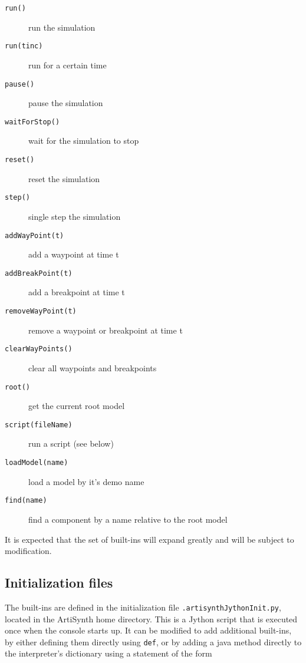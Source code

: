 \documentclass{article}
\begin{document}
\begin{description}

\item[{\tt run()}] \mbox{}
 run the simulation

\item[{\tt run(tinc)}] \mbox{}
 run for a certain time

\item[{\tt pause()}] \mbox{}
 pause the simulation

\item[{\tt waitForStop()}] \mbox{}
 wait for the simulation to stop

\item[{\tt reset()}] \mbox{}
 reset the simulation

\item[{\tt step()}] \mbox{}
 single step the simulation

\item[{\tt addWayPoint(t)}] \mbox{}
 add a waypoint at time t

\item[{\tt addBreakPoint(t)}] \mbox{}
 add a breakpoint at time t

\item[{\tt removeWayPoint(t)}] \mbox{}
 remove a waypoint or breakpoint at time t

\item[{\tt clearWayPoints()}] \mbox{}
 clear all waypoints and breakpoints

\item[{\tt root()}] \mbox{}
 get the current root model

\item[{\tt script(fileName)}] \mbox{}
 run a script (see below)

\item[{\tt loadModel(name)}] \mbox{}
 load a model by it's demo name

\item[{\tt find(name)}] \mbox{}
 find a component by a name relative to the root model

\end{description}

It is expected that the set of built-ins will expand greatly and will
be subject to modification.

\subsection*{Initialization files}

The built-ins are defined in the initialization file
{\tt .artisynthJythonInit.py}, located in the ArtiSynth home directory.
This is a Jython script that is executed once when the console starts
up. It can be modified to add additional built-ins, by either defining
them directly using {\tt def}, or by adding a java method directly to the
interpreter's dictionary using a statement of the form
\end{document}
